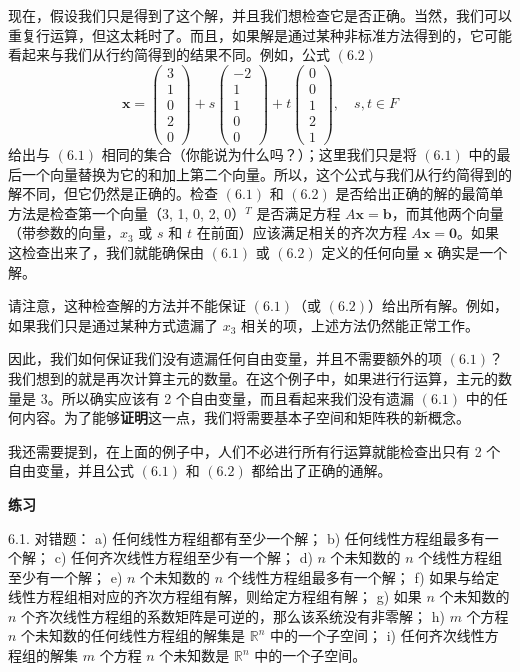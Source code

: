 现在，假设我们只是得到了这个解，并且我们想检查它是否正确。当然，我们可以重复行运算，但这太耗时了。而且，如果解是通过某种非标准方法得到的，它可能看起来与我们从行约简得到的结果不同。例如，公式 $(6.2)$
$$
\mathbf{x} = \begin{pmatrix} 3 \\ 1 \\ 0 \\ 2 \\ 0 \end{pmatrix} + s \begin{pmatrix} -2 \\ 1 \\ 1 \\ 0 \\ 0 \end{pmatrix} + t \begin{pmatrix} 0 \\ 0 \\ 1 \\ 2 \\ 1 \end{pmatrix}, \quad s, t \in F
$$
给出与 $(6.1)$ 相同的集合（你能说为什么吗？）；这里我们只是将 $(6.1)$ 中的最后一个向量替换为它的和加上第二个向量。所以，这个公式与我们从行约简得到的解不同，但它仍然是正确的。检查 $(6.1)$ 和 $(6.2)$ 是否给出正确的解的最简单方法是检查第一个向量（3, 1, 0, 2, 0）$^T$ 是否满足方程 $A \mathbf{x} = \mathbf{b}$，而其他两个向量（带参数的向量，$x_3$ 或 $s$ 和 $t$ 在前面）应该满足相关的齐次方程 $A \mathbf{x} = \mathbf{0}$。如果这检查出来了，我们就能确保由 $(6.1)$ 或 $(6.2)$ 定义的任何向量 $\mathbf{x}$ 确实是一个解。

请注意，这种检查解的方法并不能保证 $(6.1)$（或 $(6.2)$）给出所有解。例如，如果我们只是通过某种方式遗漏了 $x_3$ 相关的项，上述方法仍然能正常工作。

因此，我们如何保证我们没有遗漏任何自由变量，并且不需要额外的项 $(6.1)$？我们想到的就是再次计算主元的数量。在这个例子中，如果进行行运算，主元的数量是 3。所以确实应该有 2 个自由变量，而且看起来我们没有遗漏 $(6.1)$ 中的任何内容。为了能够\textbf{证明}这一点，我们将需要基本子空间和矩阵秩的新概念。

我还需要提到，在上面的例子中，人们不必进行所有行运算就能检查出只有 2 个自由变量，并且公式 $(6.1)$ 和 $(6.2)$ 都给出了正确的通解。

\textbf{练习}~

6.1. 对错题：
a) 任何线性方程组都有至少一个解；
b) 任何线性方程组最多有一个解；
c) 任何齐次线性方程组至少有一个解；
d) $n$ 个未知数的 $n$ 个线性方程组至少有一个解；
e) $n$ 个未知数的 $n$ 个线性方程组最多有一个解；
f) 如果与给定线性方程组相对应的齐次方程组有解，则给定方程组有解；
g) 如果 $n$ 个未知数的 $n$ 个齐次线性方程组的系数矩阵是可逆的，那么该系统没有非零解；
h) $m$ 个方程 $n$ 个未知数的任何线性方程组的解集是 $\mathbb{R}^n$ 中的一个子空间；
i) 任何齐次线性方程组的解集 $m$ 个方程 $n$ 个未知数是 $\mathbb{R}^n$ 中的一个子空间。

